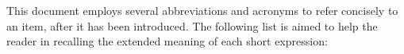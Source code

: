 
This document employs several abbreviations and acronyms to refer concisely to an item, after it has been introduced.
The following list is aimed to help the reader in recalling the extended meaning of each short expression:

\begin{acronym}[AAAAAA]
\end{acronym}


